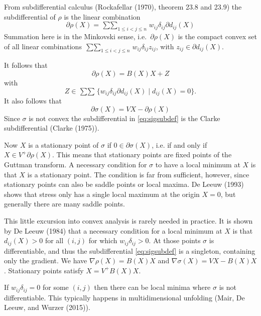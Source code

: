 \documentclass[
  12pt,
]{article}
\begin{document}
From subdifferential calculus (Rockafellar (1970), theorem 23.8 and 23.9) the subdifferential of \(\rho\) is the linear combination
\begin{equation}
\partial\rho(X)=\mathop{\sum\sum}_{1\leq i<j\leq n}w_{ij}\delta_{ij}\partial d_{ij}(X)
\label{eq:subdif}
\end{equation}
Summation here is in the Minkovski sense, i.e.~\(\partial\rho(X)\) is the compact convex set of all linear combinations \(\mathop{\sum\sum}_{1\leq i<j\leq n}w_{ij}\delta_{ij}z_{ij}\),
with \(z_{ij}\in\partial d_{ij}(X)\).

It follows that
\begin{equation}
\partial\rho(X)=B(X)X+Z
\label{eq:rhosubdef}
\end{equation}
with
\begin{equation}
Z\in\mathop{\sum\sum}\{w_{ij}\delta_{ij}\partial d_{ij}(X)\mid d_{ij}(X)=0\}.
\label{eq:zsubdef}
\end{equation}
It also follows that
\begin{equation}
\partial\sigma(X)=VX-\partial\rho(X)
\label{eq:sigsubdef}
\end{equation}
Since \(\sigma\) is not convex the subdifferential in \eqref{eq:sigsubdef} is
the Clarke subdifferential (Clarke (1975)).

Now \(X\) is a stationary point of \(\sigma\) if \(0\in\partial\sigma(X)\), i.e.
if and only if \(X\in V^+\partial\rho(X)\). This means that stationary
points are fixed points of the Guttman transform.
A necessary condition for \(\sigma\) to have a local minimum at \(X\) is that \(X\) is a stationary point. The condition is far from sufficient, however, since stationary points can also be saddle points or local maxima. De Leeuw (1993) shows that stress
only has a single local maximum at the origin \(X=0\), but generally there
are many saddle points.

This little excursion into convex analysis is rarely needed in practice. It is
shown by De Leeuw (1984) that a necessary condition for a local minimum at \(X\)
is that \(d_{ij}(X)>0\) for all \((i,j)\) for which \(w_{ij}\delta_{ij}>0\). At those
points \(\sigma\) is differentiable, and thus the subdifferential
\eqref{eq:sigsubdef} is a singleton, containing only the gradient.
We have \(\nabla\rho(X)=B(X)X\) and \(\nabla\sigma(X)=VX-B(X)X\).
Stationary points satisfy \(X=V^+B(X)X\).

If \(w_{ij}\delta_{ij}=0\) for some \((i,j)\) then there can be local minima
where \(\sigma\) is not differentiable. This typically happens in
multidimensional unfolding (Mair, De Leeuw, and Wurzer (2015)).
\end{document}

